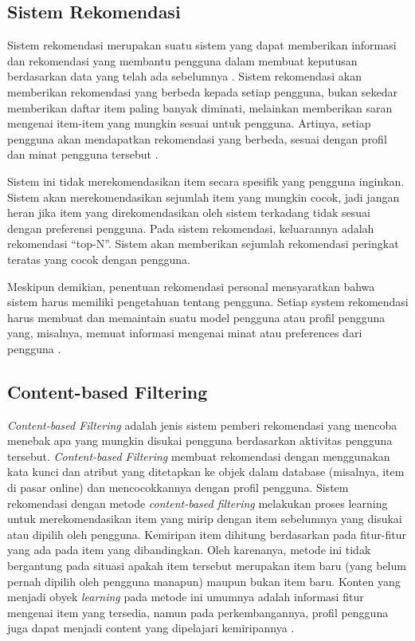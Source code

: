 \subsection{Sistem Rekomendasi}
Sistem rekomendasi merupakan suatu sistem yang dapat memberikan informasi dan rekomendasi yang membantu pengguna dalam membuat keputusan berdasarkan data yang telah ada sebelumnya
\citep{clustering}. Sistem rekomendasi akan memberikan rekomendasi yang berbeda kepada setiap pengguna, bukan sekedar memberikan daftar item paling banyak diminati, melainkan memberikan
saran mengenai item-item yang mungkin sesuai untuk pengguna. Artinya, setiap pengguna akan mendapatkan rekomendasi yang berbeda, sesuai dengan profil dan minat
pengguna tersebut \citep{contentBasedXCollaborative}.

Sistem ini tidak merekomendasikan item secara spesifik yang pengguna inginkan. Sistem akan merekomendasikan sejumlah item yang mungkin cocok, jadi jangan heran jika
item yang direkomendasikan oleh sistem terkadang tidak sesuai dengan preferensi pengguna. Pada sistem rekomendasi, keluarannya adalah rekomendasi “top-N”. Sistem akan memberikan sejumlah
rekomendasi peringkat teratas yang cocok dengan pengguna.

Meskipun demikian, penentuan rekomendasi personal mensyaratkan bahwa sistem harus memiliki pengetahuan tentang pengguna. Setiap system rekomendasi harus membuat dan
memaintain suatu model pengguna atau profil pengguna yang, misalnya, memuat informasi mengenai minat atau preferences dari pengguna \citep{contentBasedXCollaborative}.

\subsection{Content-based Filtering}
\emph{Content-based Filtering} adalah jenis sistem pemberi rekomendasi yang mencoba menebak apa yang mungkin disukai pengguna berdasarkan aktivitas pengguna tersebut. \emph{Content-based Filtering}
membuat rekomendasi dengan menggunakan kata kunci dan atribut yang ditetapkan ke objek dalam database (misalnya, item di pasar online) dan mencocokkannya dengan profil pengguna.
Sistem rekomendasi dengan metode \emph{content-based filtering} melakukan proses learning untuk merekomendasikan item yang mirip dengan item sebelumnya
yang disukai atau dipilih oleh pengguna. Kemiripan item dihitung berdasarkan pada fitur-fitur yang ada pada item yang dibandingkan. Oleh karenanya, metode ini tidak bergantung
pada situasi apakah item tersebut merupakan item baru {(yang belum pernah dipilih oleh pengguna manapun)} maupun bukan item baru. Konten yang menjadi obyek \emph{learning} pada
metode ini umumnya adalah informasi fitur mengenai item yang tersedia, namun pada perkembangannya, profil pengguna juga dapat menjadi content yang dipelajari
kemiripannya \citep{contentBasedXCollaborative}.


